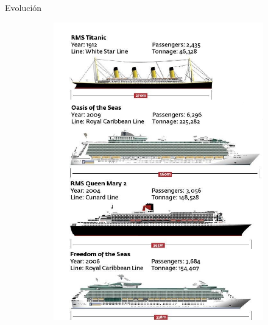 \documentclass{beamer}
\begin{document}
\begin{frame}{Evolución }

\begin{figure}

\centering
\begin{subfigure}[h]{0.35\textwidth} 
	\includegraphics[width=\textwidth]{b1}
	

\end{subfigure}
\end{figure}
\end{frame}
\end{document}

